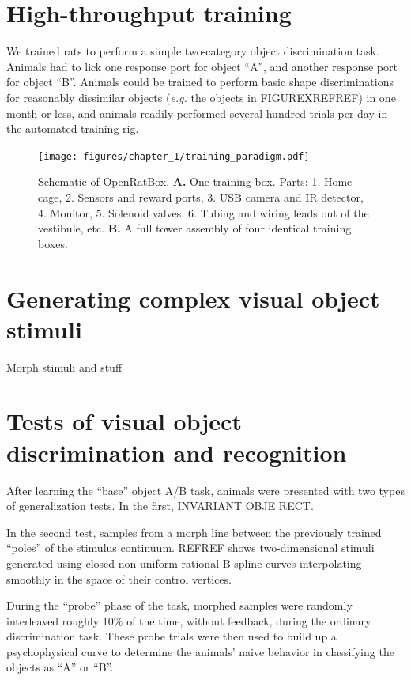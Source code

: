 \section{High-throughput training}

We trained rats to perform a simple two-category object discrimination task. Animals had to lick one response port for object ``A'', and another response port for object ``B''.  Animals could be trained to perform basic shape discriminations for reasonably dissimilar objects (\textit{e.g.} the objects in FIGUREXREFREF) in one month or less, and animals readily performed several hundred trials per day in the automated training rig. 


\begin{figure}[t!]
    \texttt{[image: figures/chapter\_1/training\_paradigm.pdf]}
    \vspace{.1in}
    \caption[OpenRatBox]{Schematic of OpenRatBox. \textbf{A.} One training box. Parts: 1. Home cage, 2. Sensors and reward ports, 3. USB camera and IR detector, 4. Monitor, 5. Solenoid valves, 6. Tubing and wiring leads out of the vestibule, etc. \textbf{B.} A full tower assembly of four identical training boxes. 
    \label{fig:ratbox_schematic}}
\end{figure}


\section{Generating complex visual object stimuli}
Morph stimuli and stuff


\section{Tests of visual object discrimination and recognition}

After learning the ``base'' object A/B task, animals were presented with two types of generalization tests. In the first, INVARIANT OBJE RECT.

In the second test, samples from a morph line between the previously trained ``poles'' of the stimulus continuum. REFREF shows two-dimensional stimuli generated using closed non-uniform rational B-spline curves interpolating smoothly in the space of their control vertices. 

During the ``probe'' phase of the task, morphed samples were randomly interleaved roughly 10\% of the time, without feedback, during the ordinary discrimination task. These probe trials were then used to build up a psychophysical curve to determine the animals' naive behavior in classifying the objects as ``A'' or ``B''. 

